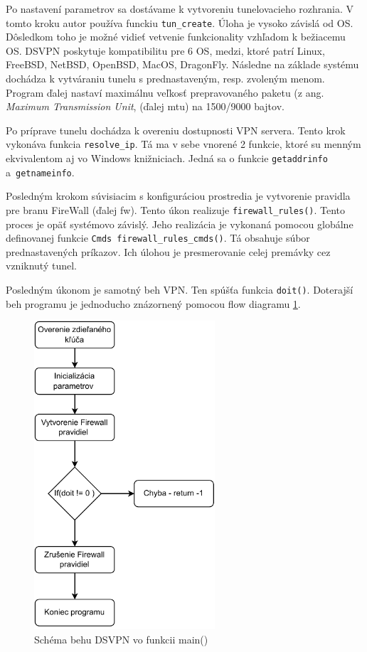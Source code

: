 Po nastavení parametrov sa dostávame k vytvoreniu tunelovacieho rozhrania. V tomto kroku autor používa funckiu \lstinline|tun_create|. Úloha je vysoko závislá od OS. Dôsledkom toho je možné vidieť vetvenie funkcionality vzhľadom k bežiacemu OS. DSVPN poskytuje kompatibilitu pre 6 OS, medzi, ktoré patrí Linux, FreeBSD, NetBSD, OpenBSD, MacOS, DragonFly. Následne na základe systému dochádza k vytváraniu tunelu s prednastaveným, resp. zvoleným menom. Program ďalej nastaví maximálnu veľkosť prepravovaného paketu (z ang. \textit{Maximum Transmission Unit}, (ďalej \acrshort{mtu}) na 1500/9000 bajtov. 
 
Po príprave tunelu dochádza k overeniu dostupnosti VPN servera. Tento krok vykonáva funkcia \lstinline|resolve_ip|. Tá ma v sebe vnorené 2 funkcie, ktoré su menným ekvivalentom aj vo Windows knižniciach. Jedná sa o funkcie \lstinline|getaddrinfo| \\a~\lstinline|getnameinfo|.  
 
Posledným krokom súvisiacim s konfiguráciou prostredia je vytvorenie pravidla pre branu FireWall (ďalej \acrshort{fw}). Tento úkon realizuje \lstinline|firewall_rules()|. Tento proces je opäť systémovo závislý. Jeho realizácia je vykonaná pomocou globálne definovanej funkcie \lstinline|Cmds firewall_rules_cmds()|. Tá obsahuje súbor prednastavených príkazov. Ich úlohou je presmerovanie celej premávky cez vzniknutý tunel.
 
Posledným úkonom je samotný beh VPN. Ten spúšťa funkcia \lstinline|doit()|. Doterajší beh programu je jednoducho znázornený pomocou flow diagramu \ref{fc1}.
 
\begin{figure}[!h]
	\centering
	\includegraphics[width=0.6\textwidth]{figures/fc1}
	\caption{Schéma behu DSVPN vo funkcii main()}
	\label{fc1}
\end{figure}

